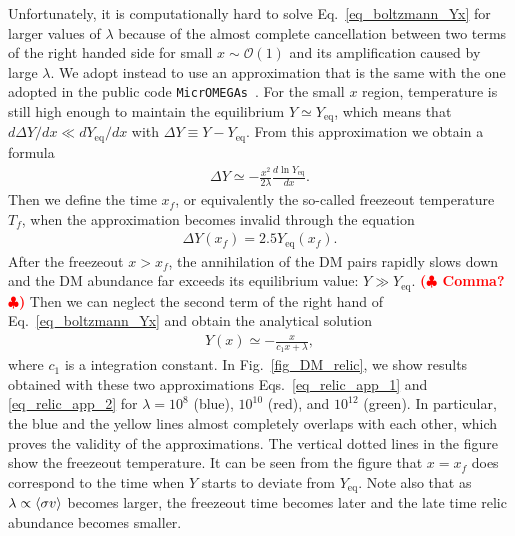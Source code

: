 \documentclass[12pt,twoside,book]{article}
\def\rem#1{ {\bf\textcolor{red}{($\clubsuit$ #1 $\clubsuit$)}}}
\begin{document}
Unfortunately, it is computationally hard to solve
Eq.~\eqref{eq_boltzmann_Yx} for larger values of $\lambda$ because of
the almost complete cancellation between two terms of the right handed
side for small $x\sim \mathcal{O}(1)$ and its amplification caused by
large $\lambda$.  We adopt instead to use an approximation that is the
same with the one adopted in the public code
\texttt{MicrOMEGAs}~\cite{Belanger:2001fz, Belanger:2018mqt}.  For the
small $x$ region, temperature is still high enough to maintain the
equilibrium $Y \simeq Y_{\mathrm{eq}}$, which means that $d \Delta Y / d
x \ll d Y_{\mathrm{eq}} / d x$ with $\Delta Y \equiv Y -
Y_{\mathrm{eq}}$.  From this approximation we obtain a formula
\begin{align}
 \Delta Y \simeq -\frac{x^2}{2 \lambda} \frac{d \ln Y_{\mathrm{eq}}}{d x}.\label{eq_relic_app_1}
\end{align}
Then we define the time $x_f$, or equivalently the so-called freezeout
temperature $T_f$, when the approximation becomes invalid through the
equation
\begin{align}
 \Delta Y (x_f) = 2.5 Y_{\mathrm{eq}} (x_f).
\end{align}
After the freezeout $x > x_f$, the annihilation of the DM pairs
rapidly slows down and the DM abundance far exceeds its equilibrium
value: $Y \gg Y_{\mathrm{eq}}$.  \rem{Comma?}  Then we can neglect the
second term of the right hand of Eq.~\eqref{eq_boltzmann_Yx} and
obtain the analytical solution
\begin{align}
 Y(x) \simeq - \frac{x}{c_1 x + \lambda},\label{eq_relic_app_2}
\end{align}
where $c_1$ is a integration constant.  In Fig.~\ref{fig_DM_relic}, we
show results obtained with these two approximations
Eqs.~\eqref{eq_relic_app_1} and \eqref{eq_relic_app_2} for $\lambda =
10^8$ (blue), $10^{10}$ (red), and $10^{12}$ (green).  In particular,
the blue and the yellow lines almost completely overlaps with each
other, which proves the validity of the approximations.  The vertical
dotted lines in the figure show the freezeout temperature.  It can be
seen from the figure that $x = x_f$ does correspond to the time when $Y$
starts to deviate from $Y_{\mathrm{eq}}$.  Note also that as $\lambda
\propto \Braket{\sigma v}$ becomes larger, the freezeout time becomes
later and the late time relic abundance becomes smaller.
\end{document}
